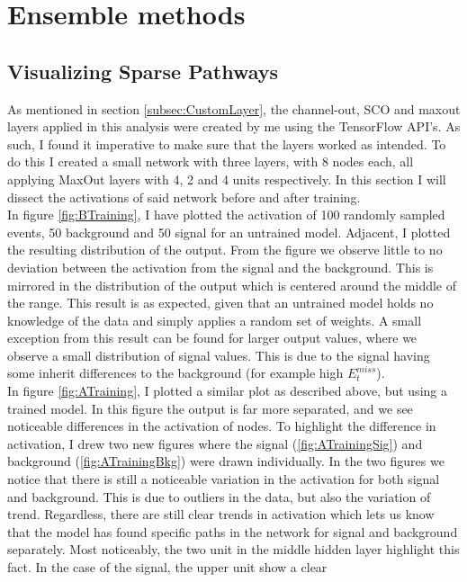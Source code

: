 \section{Ensemble methods}\label{sec:Ensemble}
\subsection{Visualizing Sparse Pathways}\label{subsec:Viz}
As mentioned in section \ref{subsec:CustomLayer}, the channel-out, \ac{SCO} and maxout layers applied in this 
analysis were created by me using the TensorFlow \ac{API}'s. As such, I found it imperative to make
sure that the layers worked as intended. To do this I created a small network with three layers, with 8 
nodes each, all applying MaxOut layers with 4, 2 and 4 units respectively. In this section I will 
dissect the activations of said network before and after training.
\\
In figure \ref{fig:BTraining}, I have plotted the activation of 100 randomly sampled events, 50 
background and 50 signal for an untrained model. Adjacent, I plotted the resulting distribution of the 
output. From the figure we observe little to no deviation between the activation from the signal and 
the background. This is mirrored in the distribution of the output which is centered around the middle 
of the range. This result is as expected, given that an untrained model holds no knowledge of the data and 
simply applies a random set of weights. A small exception from this result can be found for larger output values, 
where we observe a small distribution of signal values. This is due to the signal having some inherit differences
to the background (for example high $E_t^{miss}$).
\\
In figure \ref{fig:ATraining}, I plotted a similar plot as described above, but using a trained model.
In this figure the output is far more separated, and we see noticeable differences in the activation 
of nodes. To highlight the difference in activation, I drew two new figures where the signal 
(\ref{fig:ATrainingSig}) and background (\ref{fig:ATrainingBkg}) were drawn individually.
In the two figures we notice that there is still a noticeable variation in the activation for
both signal and background. This is due to outliers in the data, but also the variation of trend.
Regardless, there are still clear trends in activation which lets us know that the model has found 
specific paths in the network for signal and background separately. Most noticeably, the two unit 
in the middle hidden layer highlight this fact. In the case of the signal, the upper unit show a clear 
